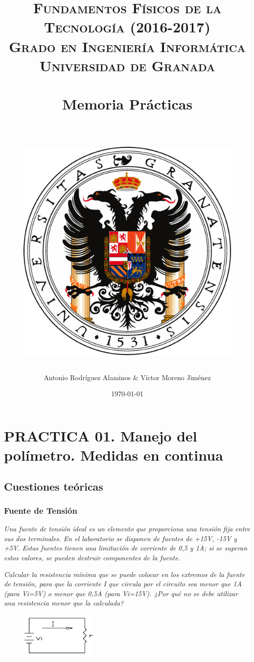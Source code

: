 \documentclass[paper=a4, fontsize=11pt]{scrartcl} %
\title{	
\normalfont \normalsize 
\textsc{\textbf{Fundamentos Físicos de la Tecnología (2016-2017)} \\ Grado en Ingeniería Informática \\ Universidad de Granada} \\ [25pt] %
\horrule{0.5pt} \\[0.4cm] %
\huge Memoria Prácticas \\ %
\horrule{2pt} \\[0.5cm] %
\begin{figure}[H] %
	\centering
	\includegraphics[scale=0.5]{image/ugr.png}  %
\end{figure}
}
\author{Antonio Rodríguez Alaminos & Víctor Moreno Jiménez} %
\date{\normalsize\today} %
\numberwithin{equation}{section} %
\numberwithin{figure}{section} %
\numberwithin{table}{section} %
\begin{document}
\maketitle %

\newpage %

\tableofcontents %

\listoffigures

\listoftables

\newpage


\section{PRACTICA 01. Manejo del polímetro. Medidas en continua \cite{IA}} 

\subsection{Cuestiones teóricas}

\subsubsection{Fuente de Tensión} 

\textit{Una fuente de tensión ideal es un elemento que proporciona una tensión fija entre sus dos terminales. En el laboratorio se disponen de fuentes de +15V, -15V y +5V. Estas fuentes tienen una limitación de corriente de 0,5 y 1A; si se superan estos valores, se pueden destruir componentes de la fuente.} \newline

\textit{Calcular la resistencia mínima que se puede colocar en los extremos de la fuente de tensión, para que la corriente I que circula por el circuito sea menor que 1A (para Vi=5V) o menor que 0,5A (para Vi=15V). ¿Por qué no se debe utilizar una resistencia menor que la calculada?} \newline

\begin{figure}[h]
\centering
\includegraphics{image/fuente-tension}
\end{figure}
\end{document}
